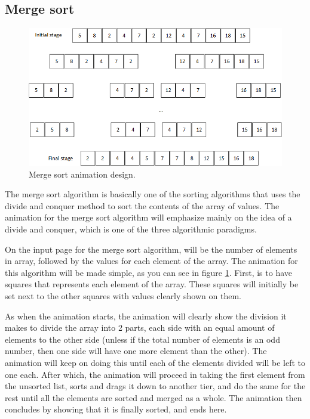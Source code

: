 

\newpage

\subsection{Merge sort}

\begin{figure}[H]
\centering
\includegraphics[scale=0.9]{images/report_images/animationDesignMergeSort.png}
\caption{Merge sort animation design.}
\label{animationDesignMergeSort}
\end{figure}

The merge sort algorithm is basically one of the sorting algorithms that uses the divide and conquer method to sort the contents of the array of values. The animation for the merge sort algorithm will emphasize mainly on the idea of a divide and conquer, which is one of the three algorithmic paradigms. 

On the input page for the merge sort algorithm, will be the number of elements in array, followed by the values for each element of the array. The animation for this algorithm will be made simple, as you can see in figure \ref{animationDesignMergeSort}. First, is to have squares that represents each element of the array. These squares will initially be set next to the other squares with values clearly shown on them.

As when the animation starts, the animation will clearly show the division it makes to divide the array into 2 parts, each side with an equal amount of elements to the other side (unless if the total number of elements is an odd number, then one side will have one more element than the other). The animation will keep on doing this until each of the elements divided will be left to one each. After which, the animation will proceed in taking the first element from the unsorted list, sorts and drags it down to another tier, and do the same for the rest until all the elements are sorted and merged as a whole. The animation then concludes by showing that it is finally sorted, and ends here.

